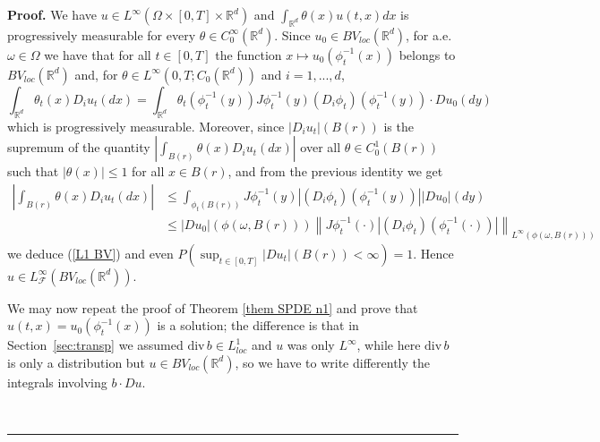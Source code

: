 \documentclass[a4paper,11pt]{article}
\newenvironment{proof}[1][Proof]{\textbf{#1.} }{\ \rule{0.5em}{0.5em}}
\begin{document}
\begin{proof}
We have $u\in L^{\infty }\left( \Omega \times \left[ 0,T\right] \times
\mathbb{R}^{d}\right) $ and $\int_{\mathbb{R}^{d}}\theta \left( x\right)
u\left( t,x\right) dx$ is progressively measurable for every $\theta \in
C_{0}^{\infty }\left( \mathbb{R}^{d}\right) $. Since $u_{0}\in
BV_{loc}\left( \mathbb{R}^{d}\right) $, for a.e. $\omega \in \Omega $ we
have that for all $t\in \left[ 0,T\right] $ the function $x\mapsto
u_{0}\left( \phi _{t}^{-1}\left( x\right) \right) $ belongs to $%
BV_{loc}\left( \mathbb{R}^{d}\right) $ and, for $\theta \in L^{\infty
}\left( 0,T;C_{0}\left( \mathbb{R}^{d}\right) \right) $ and $i=1,...,d$,
\begin{equation*}
\int_{\mathbb{R}^{d}}\theta _{t}\left( x\right) D_{i}u_{t}\left( dx\right)
=\int_{\mathbb{R}^{d}}\theta _{t}\left( \phi _{t}^{-1}\left( y\right)
\right) J\phi _{t}^{-1}\left( y\right) \left( D_{i}\phi _{t}\right) \left(
\phi _{t}^{-1}\left( y\right) \right) \cdot Du_{0}\left( dy\right)
\end{equation*}
which is progressively measurable. Moreover, since $|D_{i}u_{t}|\left(
B\left( r\right) \right) $ is the supremum of the quantity $\left| \int_{B\left( r\right)
}\theta \left( x\right) D_{i}u_{t}\left( dx\right) \right| $ over all $%
\theta \in C_{0}^{1}\left( B\left( r\right) \right) $ such that $\left|
\theta \left( x\right) \right| \leq 1$ for all $x\in B\left( r\right) $, and
from the previous identity we get
\begin{align*}
\left| \int_{B\left( r\right) }\theta \left( x\right) D_{i}u_{t}\left(
dx\right) \right| & \leq \int_{\phi _{t}\left( B\left( r\right) \right)
}J\phi _{t}^{-1}\left( y\right) \left| \left( D_{i}\phi _{t}\right) \left(
\phi _{t}^{-1}\left( y\right) \right) \right| \left| Du_{0}\right| \left(
dy\right)  \\
& \leq \left| Du_{0}\right| \left( \phi \left( \omega ,B\left( r\right)
\right) \right) \left\| J\phi _{t}^{-1}\left( \cdot \right) \left| \left(
D_{i}\phi _{t}\right) \left( \phi _{t}^{-1}\left( \cdot \right) \right)
\right| \right\| _{L^{\infty }\left( \phi \left( \omega ,B\left( r\right)
\right) \right) }
\end{align*}
we deduce (\ref{L1 BV}) and even
$
P( \sup_{t\in[ 0,T] }|Du_{t}|( B( r)
) <\infty) =1
$.
Hence $u\in L_{\mathcal{F}}^{\infty }\left( BV_{loc}\left( \mathbb{R}%
^{d}\right) \right) $.

We may now repeat the proof of Theorem \ref{them SPDE n1} and prove that $%
u\left( t,x\right) =u_{0}\left( \phi _{t}^{-1}\left( x\right) \right) $ is a
solution; the difference is that in Section~\ref{sec:transp} we assumed $%
\mathrm{div}\,b\in L_{loc}^{1}$ and $u$ was only $L^{\infty }$, while here $%
\mathrm{div}\,b$ is only a distribution but $u\in BV_{loc}\left( \mathbb{R}%
^{d}\right) $, so we have to write differently the integrals involving $%
b\cdot Du$.


\end{proof}
\end{document}
